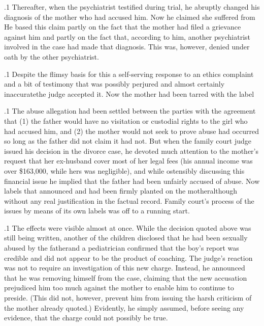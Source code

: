 \documentclass[11pt, twoside]{article}
\begin{document}
{\p.1{%
Thereafter, when the psychiatrist testified during trial, he abruptly
changed his diagnosis of the mother who had accused him. Now he
claimed she suffered from  He based
this claim partly on the fact that the mother had filed a grievance against
him and partly on the fact that, according to him, another psychiatrist
involved in the case had made that diagnosis. This was, however, denied
under oath by the other psychiatrist.
}%

\p.1{%
Despite the flimsy basis for this \mdash{}a self-serving response
to an ethics complaint and a bit of testimony that was possibly perjured
and almost certainly inaccurate\mdash{}the judge accepted it. Now the mother
had been tarred with the label 
}%

\p.1{%
The abuse allegation had been settled between the parties with the
agreement that (1) the father would have no visitation or custodial rights
to the girl who had accused him, and (2) the mother would not seek to
prove abuse had occurred so long as the father did not claim it had not.
But when the family court judge issued his decision in the divorce case,
he devoted much attention to the mother’s request that her ex-husband
cover most of her legal fees (his annual income was over \$163,000, while
hers was negligible), and while ostensibly discussing this financial issue
he implied that the father had been unfairly accused of abuse.
Now labels that announced  and 
had been firmly planted on the mother\mdash{}although without any real justification in the factual record. Family court’s process of 
the issues by means of its own labels was off to a running start.
}%

\p.1{%
The effects were visible almost at once. While the decision quoted above was still being written, another of the children disclosed that he
had been sexually abused by the father\mdash{}and a pediatrician confirmed
that the boy’s report was credible and did not appear to be the product of coaching. The judge’s reaction was not to require an investigation
of this new charge. Instead, he announced that he was removing himself from the case, claiming that the new accusation prejudiced him too
much against the mother to enable him to continue to preside. (This
did not, however, prevent him from issuing the harsh criticism of the
mother already quoted.) Evidently, he simply assumed, before seeing
any evidence, that the charge could not possibly be true.
}%

}
\end{document}
